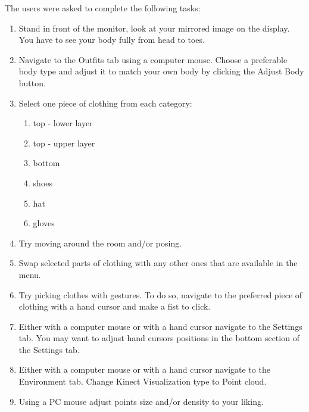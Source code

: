 \documentclass[a4paper]{report}
\begin{document}
    The users were asked to complete the following tasks: 

  \begin{mdframed}
  \bigskip
       \begin{enumerate}
         \item Stand in front of the monitor, look at your mirrored image on the display. You have to see your body fully from head to toes. 
        
         \item Navigate to the Outfits tab using a computer mouse. Choose a preferable body type and adjust it to match your own body by clicking the Adjust Body button.
         
         \item Select one piece of clothing from each category:
         \begin{enumerate}
            \item top - lower layer
            \item top - upper layer
            \item bottom 
            \item shoes
            \item hat
            \item gloves
         \end{enumerate}
     
        
        \item Try moving around the room and/or posing. 
        
        \item Swap selected parts of clothing with any other ones that are available in the menu. 
        
        \item Try picking clothes with gestures. To do so, navigate to the preferred piece of clothing with a hand cursor and make a fist to click. 
        
        \item Either with a computer mouse or with a hand cursor navigate to the Settings tab. You may want to adjust hand cursors positions in the bottom section of the Settings tab. 
        
        \item Either with a computer mouse or with a hand cursor navigate to the Environment tab.
        Change Kinect Visualization type to Point cloud. 
        
        \item Using a PC mouse adjust points size and/or density to your liking. 
        

\end{enumerate}
\end{mdframed}
\end{document}
